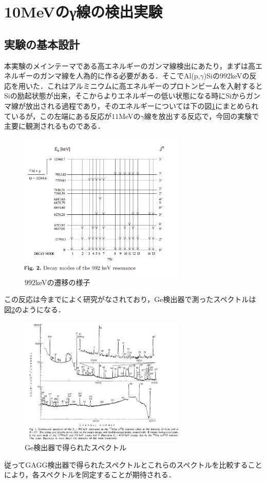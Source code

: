 \documentclass[a4j]{jarticle}
\begin{document}
\newpage
\section{10MeVのγ線の検出実験}

\subsection{実験の基本設計}
本実験のメインテーマである高エネルギーのガンマ線検出にあたり，まずは高エネルギーのガンマ線を人為的に作る必要がある．そこでAl(p,$\gamma$)Siの$992$keVの反応を用いた．これはアルミニウムに高エネルギーのプロトンビームを入射するとSiの励起状態が出来，そこからよりエネルギーの低い状態になる時にSiからガンマ線が放出される過程であり，そのエネルギーについては下の図\ref{035121_3Sep18}にまとめられているが，この左端にある反応が$11$MeVの$\gamma$線を放出する反応で，今回の実験で主要に観測されるものである．
\begin{figure}[htb]
 \centering
 \includegraphics[bb=0 0 936 825,width=8cm]{energy.jpg}
 \caption{$992$keVの遷移の様子}
 \label{035121_3Sep18}
\end{figure}


この反応は今までによく研究がなされており，Ge検出器で測ったスペクトルは図\ref{025209_3Sep18}のようになる．
\begin{figure}[htb]
 \centering
 \includegraphics[bb=0 0 1025 783,width=8cm]{spectrumGe.jpg}
 \caption{Ge検出器で得られたスペクトル}
 \label{025209_3Sep18}
\end{figure}
従ってGAGG検出器で得られたスペクトルとこれらのスペクトルを比較することにより，各スペクトルを同定することが期待される．
\end{document}
